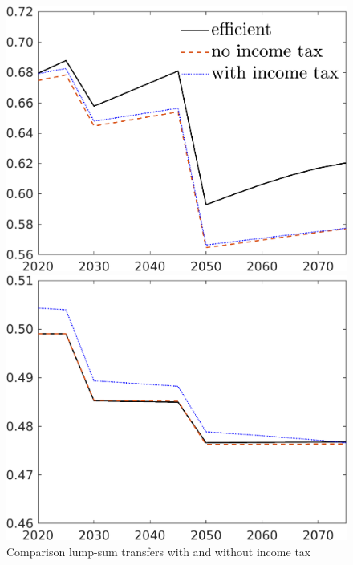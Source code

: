 \begin{figure}[h!!]
	\centering
	\caption{Comparison lump-sum transfers with and without income tax}\label{fig:bench_lumpsum_vglNotaul}
	
	\begin{minipage}[]{0.32\textwidth}
		\includegraphics[width=1\textwidth]{../../codding_model/own_basedOnFried/optimalPol_190722_tidiedUp/figures/all_July22/C_DDCompEffOPT_T_NoTaus_pol4_spillover0_noskill0_sep1_xgrowth0_etaa0.79_lgd1_lff0.png}
	\end{minipage}
	\begin{minipage}[]{0.32\textwidth}
		\includegraphics[width=1\textwidth]{../../codding_model/own_basedOnFried/optimalPol_190722_tidiedUp/figures/all_July22/hh_DDCompEffOPT_T_NoTaus_pol4_spillover0_noskill0_sep1_xgrowth0_etaa0.79_lgd0_lff0.png}

\end{minipage}
\end{figure}
